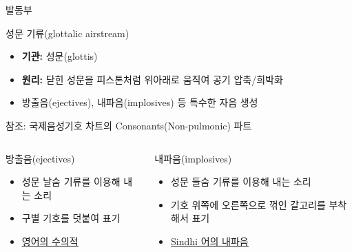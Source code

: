 \documentclass[11pt, aspectratio=169]{beamer}
\newcommand{\textds}[1]{{\ipafont #1}}
\begin{document}
\begin{frame}[t]{발동부}
    \begin{block}{성문 기류(glottalic airstream)}
        \begin{itemize}
            \item \textbf{기관:} 성문(glottis)
            \item \textbf{원리:} 닫힌 성문을 피스톤처럼 위아래로 움직여 공기 압축/희박화
            \item 방출음(ejectives), 내파음(implosives) 등 특수한 자음 생성
        \end{itemize}
    \end{block}
    참조: 국제음성기호 차트의 Consonants(Non-pulmonic) 파트
    \begin{columns}
        \begin{column}[T]{0.46\textwidth}
            \begin{block}{방출음(ejectives)}
                \begin{itemize}
                    \item 성문 날숨 기류를 이용해 내는 소리
                    \item \textds{[’]} 구별 기호를 덧붙여 표기
                    \item {} \href{https://youtu.be/rP0-MfE4zbA}{\underline{영어의 수의적 \textds{[k’]}}}
                \end{itemize}
            \end{block}           
        \end{column}
        \begin{column}[T]{0.47\textwidth}
            \begin{block}{내파음(implosives)}
                \begin{itemize}
                    \item 성문 들숨 기류를 이용해 내는 소리
                    \item 기호 위쪽에 오른쪽으로 꺾인 갈고리를 부착해서 표기 \textds{[ɓ, ɗ, ɠ]}
                    \item {} \href{https://www.phonetics.ucla.edu/course/chapter6/sindhi/sinhi.html}{\underline{Sindhi 어의 내파음}}
                \end{itemize}
            \end{block}                       
        \end{column}
    \end{columns}
\end{frame}
\end{document}
